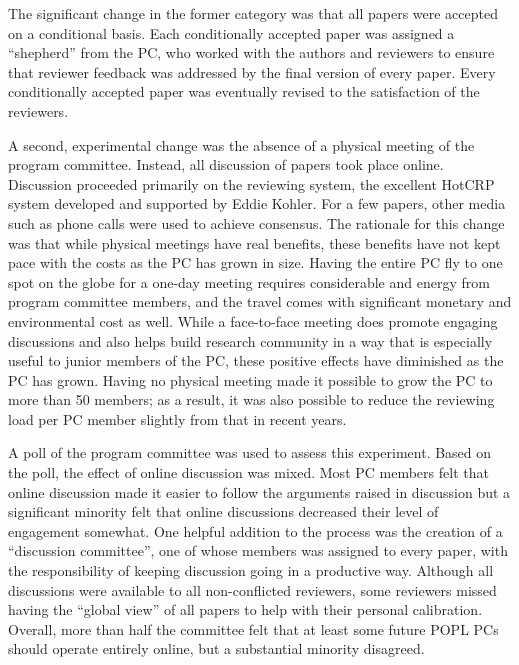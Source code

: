 \documentclass[11pt]{article}
\begin{document}
The significant change in the former category was that all papers were
accepted on a conditional basis. Each conditionally accepted paper
was assigned a ``shepherd'' from the PC, who worked with the authors
and reviewers to ensure that reviewer feedback was addressed by the
final version of every paper. Every conditionally accepted paper was
eventually revised to the satisfaction of the reviewers.

A second, experimental change was the absence of a physical meeting of
the program committee. Instead, all discussion of papers took place
online. Discussion proceeded primarily on the reviewing system,
the excellent HotCRP system developed and supported by Eddie Kohler.
For a few papers, other media such as phone calls were used to achieve
consensus. The
rationale for this change was that while physical meetings have real
benefits, these benefits have not kept pace with the costs as the PC
has grown in size.  Having the entire PC fly to one spot on the globe
for a one-day meeting requires considerable and energy from program
committee members, and the travel comes with significant monetary and
environmental cost as well. While a face-to-face meeting does promote
engaging discussions and also helps build research community in a way
that is especially useful to junior members of the PC, these positive
effects have diminished as the PC has grown. Having no physical
meeting made it possible to grow the PC to more than 50 members; as
a result, it was also possible to reduce the reviewing load per PC
member slightly from that in recent years.

A poll of the program committee was used to assess this experiment.
Based on the poll, the effect of online discussion was mixed. Most
PC members felt that online discussion made it easier to follow the
arguments raised in discussion but a significant minority felt that
online discussions decreased their level of engagement somewhat. One
helpful addition to the process was the creation of a ``discussion
committee'', one of whose members was assigned to every paper, with
the responsibility of keeping discussion going in a productive
way. Although all discussions were available to all non-conflicted
reviewers, some reviewers missed having the ``global view'' of all
papers to help with their personal calibration. Overall, more than half the
committee felt that at least some future POPL PCs should operate
entirely online, but a substantial minority disagreed.
\end{document}
